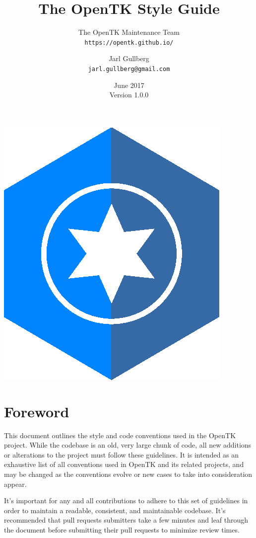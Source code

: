 \documentclass[11pt,a4paper]{article}
\title
{
    \textbf
    {
        The OpenTK Style Guide
    }
}
\author
{
    The OpenTK Maintenance Team\\
    \texttt{https://opentk.github.io/}
    \and
    Jarl Gullberg\\
    \texttt{jarl.gullberg@gmail.com}
}
\date
{
    June 2017\\
    Version 1.0.0
}
\begin{document}
\maketitle

\begin{center}
    \includegraphics[scale=1]{opentk-blue-hexagon}
\end{center}

\pagebreak
\tableofcontents

\pagebreak
\listoffigures

\pagebreak
\section*{Foreword}
This document outlines the style and code conventions used in the OpenTK project. While the codebase is an old, very large chunk of code, all new additions or alterations to the project must follow these guidelines. It is intended as an exhaustive list of all conventions used in OpenTK and its related projects, and may be changed as the conventions evolve or new cases to take into consideration appear. 

It's important for any and all contributions to adhere to this set of guidelines in order to maintain a readable, consistent, and maintainable codebase. It's recommended that pull requests submitters take a few minutes and leaf through the document before submitting their pull requests to minimize review times.
\end{document}

